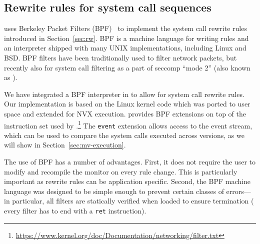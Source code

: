 \subsection{Rewrite rules for system call sequences}
\label{sec:patternmatching}

\varan uses Berkeley Packet Filters (BPF)~\cite{bpf} to implement the system call
rewrite rules introduced in Section~\ref{sec:rw}.  BPF is a machine
language for writing rules and an interpreter shipped with many UNIX
implementations, including Linux and BSD.  BPF filters have been
traditionally used to filter network packets, but recently also for
system call filtering as a part of seccomp ``mode 2'' (also known as
\seccompbpf).

We have integrated a BPF interpreter in \varan to allow for system
call rewrite rules. Our implementation is based on the Linux kernel
code which was ported to user space and extended for NVX
execution. \varan provides BPF extensions on top of the instruction set used by
\seccompbpf.\footnote{\url{https://www.kernel.org/doc/Documentation/networking/filter.txt}}
The \lstinline[language={[bpf]Assembler}]`event` extension allows access to the
event stream, which can be used to compare the system calls executed across
versions, as we will show in Section~\ref{sec:mv-execution}.




The use of BPF has a number of advantages.  First, it does not require
the user to modify and recompile the monitor on every rule
change. This is particularly important as rewrite rules can be
application specific. Second, the BPF machine language was designed to
be simple enough to prevent certain classes of errors---in particular,
all filters are statically verified when loaded to ensure termination (\ie
every filter has to end with a \lstinline[language={[bpf]Assembler}]`ret`
instruction).

